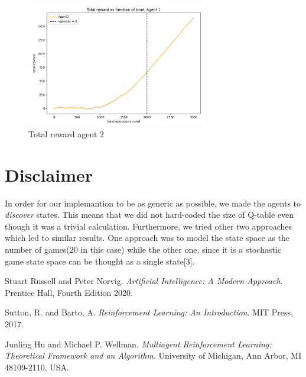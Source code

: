 \documentclass[10pt,a4paper,twocolumn]{article}
\begin{document}
	\begin{figure}[ht!]
	\centering
		\includegraphics[width=80mm]{total_reward_agent1}
		\caption{Total reward agent 2 \label{overflow}}
	\end{figure}



	\section{Disclaimer}
	In order for our implemantion to be as generic as possible, we made the agents to \textit{discover} states. This means that we did not hard-coded the size of Q-table even though it was a trivial calculation. Furthermore, we tried other two approaches which led to similar results. One approach was to model the state space as the number of games(20 in this case) while the other one, since it is a stochastic game state space can be thought as a single state[3].	



	\begin{thebibliography}{9}
		Stuart Russell and Peter Norvig. 
		\textit{Artificial Intelligence: A Modern Approach}. 
		Prentice Hall, Fourth Edition 2020.
		
		Sutton, R. and Barto, A. 
		\textit{Reinforcement Learning: An Introduction}. 
		MIT Press, 2017.
		
		Junling Hu and Michael P. Wellman.
		\textit{Multiagent Reinforcement Learning: Theoretical Framework and an Algorithm}. 
		University of Michigan, Ann Arbor, MI 48109-2110, USA.

	\end{thebibliography}
	
\end{document}
